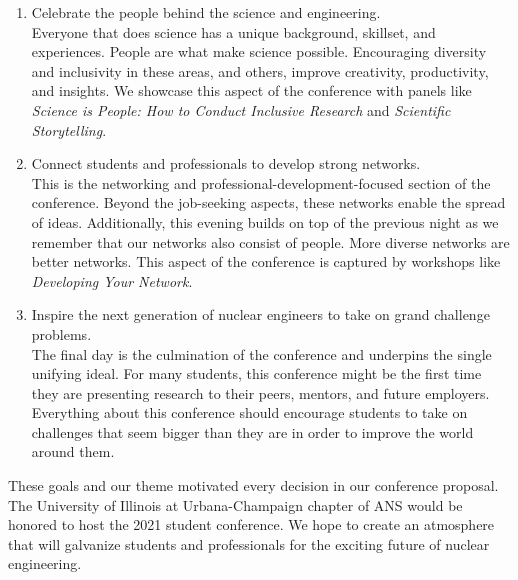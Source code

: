 \begin{enumerate}
	\item Celebrate the people behind the science and engineering.\\
	Everyone that does science has a unique background, skillset, and experiences. People are what make science possible. Encouraging diversity and inclusivity in these areas, and others, improve creativity, productivity, and insights. We showcase this aspect of the conference with panels like \textit{Science is People: How to Conduct Inclusive Research} and \textit{Scientific Storytelling}.
	\item Connect students and professionals to develop strong networks.\\
	This is the networking and professional-development-focused section of the conference. Beyond the job-seeking aspects, these networks enable the spread of ideas. Additionally, this evening builds on top of the previous night as we remember that our networks also consist of people. More diverse networks are better networks. This aspect of the conference is captured by workshops like \textit{Developing Your Network}. 
	\item Inspire the next generation of nuclear engineers to take on grand challenge problems. \\

	The final day is the culmination of the conference and underpins the single unifying ideal. For many students, this conference might be the first time they are presenting research to their peers, mentors, and future employers. Everything about this conference should encourage students to take on challenges that seem bigger than they are in order to improve the world around them.  
\end{enumerate}
These goals and our theme motivated every decision in our conference proposal. The University of Illinois at Urbana-Champaign chapter of ANS would be honored to host the 2021 student conference. We hope to create an atmosphere that will galvanize students and professionals for the exciting future of nuclear engineering.\\
